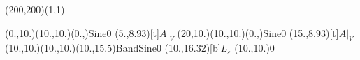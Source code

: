 \unitlength=1bp%

\begin{feynartspicture}(200,200)(1,1)

\FADiagram{}
\FAProp(0.,10.)(10.,10.)(0.,){Sine}{0}
\FALabel(5.,8.93)[t]{$A|_V$}
\FAProp(20,10.)(10.,10.)(0.,){Sine}{0}
\FALabel(15.,8.93)[t]{$A|_V$}
\FAProp(10.,10.)(10.,10.)(10.,15.5){BandSine}{0}
\FALabel(10.,16.32)[b]{$L_\varepsilon$}
\FAVert(10.,10.){0}
\end{feynartspicture}

